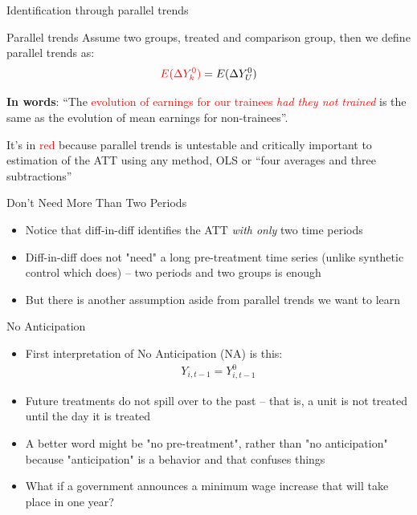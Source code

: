 \documentclass{beamer}
\begin{document}
\begin{frame}{Identification through parallel trends}


	\begin{block}{Parallel trends}
	Assume two groups, treated and comparison group, then we define parallel trends as:	 $$\textcolor{red}{E(}\textcolor{red}{\Delta Y^0_k)} = E(\Delta Y^0_U)$$
	\end{block}

\textbf{In words}: ``The \textcolor{red}{evolution of earnings for our trainees \emph{had they not trained}} is the same as the evolution of mean earnings for non-trainees''.

\bigskip

It's in \textcolor{red}{red} because parallel trends is untestable and critically important to estimation of the ATT using any method, OLS or ``four averages and three subtractions''

\end{frame}

\begin{frame}{Don't Need More Than Two Periods}

\begin{itemize}

\item Notice that diff-in-diff identifies the ATT \emph{with only} two time periods
\item Diff-in-diff does not "need" a long pre-treatment time series (unlike synthetic control which does) -- two periods and two groups is enough
\item But there is another assumption aside from parallel trends we want to learn

\end{itemize}

\end{frame}

\begin{frame}{No Anticipation}

\begin{itemize}
\item First interpretation of No Anticipation (NA) is this:
	\begin{eqnarray*}
	Y_{i,t-1}=Y^0_{i,t-1}
	\end{eqnarray*}
\item Future treatments do not spill over to the past -- that is, a unit is not treated until the day it is treated
\item A better word might be "no pre-treatment", rather than "no anticipation" because "anticipation" is a behavior and that confuses things
\item What if a government announces a minimum wage increase that will take place in one year?

\end{itemize}

\end{frame}
\end{document}
